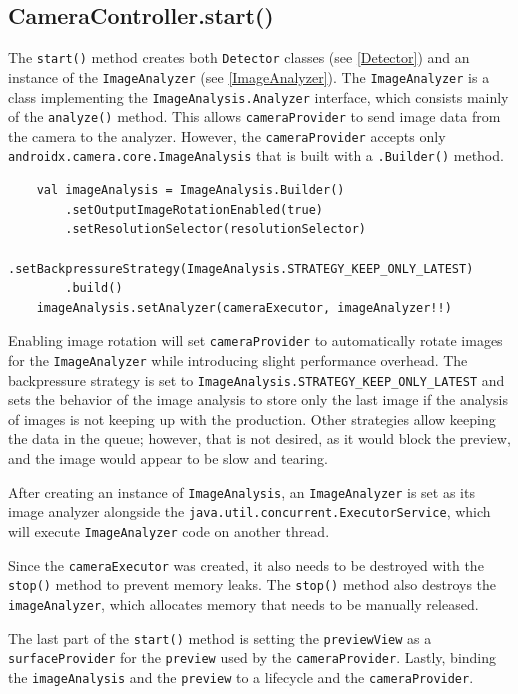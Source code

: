 \subsection{CameraController.start()}
The \texttt{start()} method creates both \texttt{Detector} classes (see \ref{Detector}) and an instance of the \texttt{ImageAnalyzer} (see \ref{ImageAnalyzer}). The \texttt{ImageAnalyzer} is a class implementing the \texttt{ImageAnalysis.Analyzer} interface, which consists mainly of the \texttt{analyze()} method. This allows \texttt{cameraProvider} to send image data from the camera to the analyzer. However, the \texttt{cameraProvider} accepts only \texttt{androidx.camera.core.ImageAnalysis} that is built with a \texttt{.Builder()} method.

\bigskip
\begin{lstlisting}
    val imageAnalysis = ImageAnalysis.Builder()
        .setOutputImageRotationEnabled(true)
        .setResolutionSelector(resolutionSelector)
        .setBackpressureStrategy(ImageAnalysis.STRATEGY_KEEP_ONLY_LATEST)
        .build()
    imageAnalysis.setAnalyzer(cameraExecutor, imageAnalyzer!!)
\end{lstlisting}
\bigskip

Enabling image rotation will set \texttt{cameraProvider} to automatically rotate images for the \texttt{ImageAnalyzer} while introducing slight performance overhead. The backpressure strategy is set to \texttt{ImageAnalysis.STRATEGY\_KEEP\_ONLY\_LATEST} \cite{ImageAnalysisAndroid} and sets the behavior of the image analysis to store only the last image if the analysis of images is not keeping up with the production. Other strategies allow keeping the data in the queue; however, that is not desired, as it would block the preview, and the image would appear to be slow and tearing.

After creating an instance of \texttt{ImageAnalysis}, an \texttt{ImageAnalyzer} is set as its image analyzer alongside the \texttt{java.util.concurrent.ExecutorService}, which will execute \texttt{ImageAnalyzer} code on another thread. 

Since the \texttt{cameraExecutor} was created, it also needs to be destroyed with the \texttt{stop()} method to prevent memory leaks. The \texttt{stop()} method also destroys the \texttt{imageAnalyzer}, which allocates memory that needs to be manually released.

The last part of the \texttt{start()} method is setting the \texttt{previewView} as a \texttt{surfaceProvider} for the \texttt{preview} used by the \texttt{cameraProvider}. Lastly, binding the \texttt{imageAnalysis} and the \texttt{preview} to a lifecycle and the \texttt{cameraProvider}.

